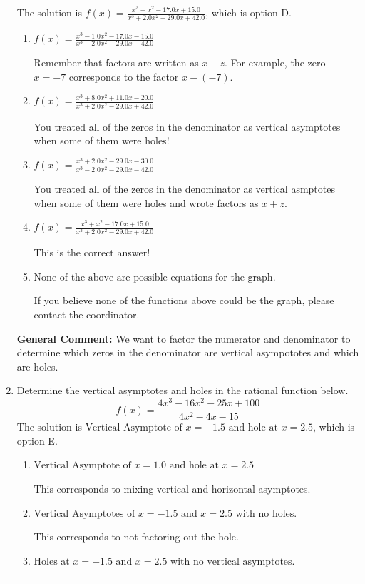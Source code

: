 \documentclass{extbook}[14pt]
\newcommand{\litem}[1]{\item #1

\rule{\textwidth}{0.4pt}}
\begin{document}
\begin{enumerate}
{The solution is \( f(x)=\frac{x^{3} + x^{2} -17.0 x + 15.0}{x^{3} +2.0 x^{2} -29.0 x + 42.0} \), which is option D.\begin{enumerate}[label=\Alph*.]
\item \( f(x)=\frac{x^{3} -1.0 x^{2} -17.0 x -15.0}{x^{3} -2.0 x^{2} -29.0 x -42.0} \)

Remember that factors are written as $x-z$. For example, the zero $x=-7$ corresponds to the factor $x-(-7)$.
\item \( f(x)=\frac{x^{3} +8.0 x^{2} +11.0 x -20.0}{x^{3} +2.0 x^{2} -29.0 x + 42.0} \)

You treated all of the zeros in the denominator as vertical asymptotes when some of them were holes!
\item \( f(x)=\frac{x^{3} +2.0 x^{2} -29.0 x -30.0}{x^{3} -2.0 x^{2} -29.0 x -42.0} \)

You treated all of the zeros in the denominator as vertical asmptotes when some of them were holes and wrote factors as $x+z$.
\item \( f(x)=\frac{x^{3} + x^{2} -17.0 x + 15.0}{x^{3} +2.0 x^{2} -29.0 x + 42.0} \)

This is the correct answer!
\item \( \text{None of the above are possible equations for the graph.} \)

If you believe none of the functions above could be the graph, please contact the coordinator.
\end{enumerate}

\textbf{General Comment:} We want to factor the numerator and denominator to determine which zeros in the denominator are vertical asympototes and which are holes.
}
\litem{
Determine the vertical asymptotes and holes in the rational function below.
\[ f(x) = \frac{4x^{3} -16 x^{2} -25 x + 100}{4x^{2} -4 x -15} \]The solution is \( \text{Vertical Asymptote of } x = -1.5 \text{ and hole at } x = 2.5 \), which is option E.\begin{enumerate}[label=\Alph*.]
\item \( \text{Vertical Asymptote of } x = 1.0 \text{ and hole at } x = 2.5 \)

This corresponds to mixing vertical and horizontal asymptotes.
\item \( \text{Vertical Asymptotes of } x = -1.5 \text{ and } x = 2.5 \text{ with no holes.} \)

This corresponds to not factoring out the hole.
\item \( \text{Holes at } x = -1.5 \text{ and } x = 2.5 \text{ with no vertical asymptotes.} \)


\end{enumerate}}
\end{enumerate}
\end{document}

